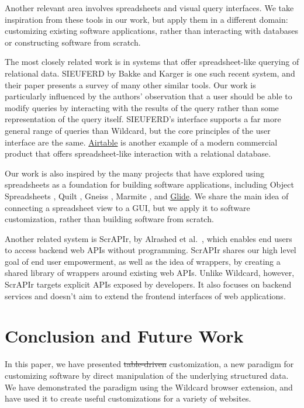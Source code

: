 \documentclass[sigplan,screen,10pt,anonymous,review]{acmart}
\providecommand{\DIFadd}[1]{{\protect\color{blue}\uwave{#1}}} %
\providecommand{\DIFdel}[1]{{\protect\color{red}\sout{#1}}}                      %
\providecommand{\DIFaddbegin}{} %
\providecommand{\DIFaddend}{} %
\providecommand{\DIFdelbegin}{} %
\providecommand{\DIFdelend}{} %
\begin{document}
Another relevant area involves spreadsheets and visual query interfaces.
We take inspiration from these tools in our work, but apply them in a
different domain: customizing existing software applications, rather
than interacting with databases or constructing software from scratch.

The most closely related work is in systems that offer spreadsheet-like
querying of relational data. SIEUFERD by Bakke and Karger
\citep{bakke2016} is one such recent system, and their paper presents a
survey of many other similar tools. Our work is particularly influenced
by the authors' observation that a user should be able to modify queries
by interacting with the results of the query rather than some
representation of the query itself. SIEUFERD's interface supports a far
more general range of queries than Wildcard, but the core principles of
the user interface are the same. \href{https://airtable.com/}{Airtable}
is another example of a modern commercial product that offers
spreadsheet-like interaction with a relational database.

Our work is also inspired by the many projects that have explored using
spreadsheets as a foundation for building software applications,
including Object Spreadsheets \citep{mccutchen2016}, Quilt
\citep{benson2014}, Gneiss \citep{chang2014}, Marmite \citep{wong2007},
and \href{https://www.glideapps.com/}{Glide}. We share the main idea of
connecting a spreadsheet view to a GUI, but we apply it to software
customization, rather than building software from scratch.

Another related system is ScrAPIr, by Alrashed et
al.~\citep{alrashed2020}, which enables end users to access backend web
APIs without programming. ScrAPIr shares our high level goal of end user
empowerment, as well as the idea of wrappers, by creating a shared
library of wrappers around existing web APIs. Unlike Wildcard, however,
ScrAPIr targets explicit APIs exposed by developers. It also focuses on
backend services and doesn't aim to extend the frontend interfaces of
web applications.

\hypertarget{sec:conclusion}{%
\section{Conclusion and Future Work}\label{sec:conclusion}}

In this paper, we have presented \DIFdelbegin \DIFdel{table-driven }\DIFdelend \DIFaddbegin \DIFadd{data-driven }\DIFaddend customization, a new
paradigm for customizing software by direct manipulation of the
underlying structured data. We have demonstrated the paradigm using the
Wildcard browser extension, and have used it to create useful
customizations for a variety of websites.
\end{document}
